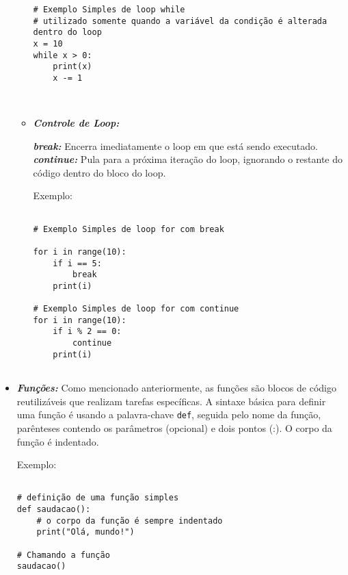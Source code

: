 \documentclass[a4paper, 12pt, onecolumn,singlespacing]{article}
\begin{document}
\begin{itemize}
\begin{itemize}
\begin{verbatim}
# Exemplo Simples de loop while
# utilizado somente quando a variável da condição é alterada dentro do loop
x = 10
while x > 0:
	print(x)
	x -= 1

	
\end{verbatim}
\label{exemplo_estruturas_de_repeticao}

	\item \textbf{\textit{Controle de Loop:}}
	
	\subitem \textbf{\textit{break:}} Encerra imediatamente o loop em que está sendo executado.
	\subitem \textbf{\textit{continue:}} Pula para a próxima iteração do loop, ignorando o restante do código dentro do bloco do loop.

	Exemplo:

	\begin{verbatim}

# Exemplo Simples de loop for com break

for i in range(10):
	if i == 5:
		break
	print(i)

# Exemplo Simples de loop for com continue
for i in range(10):
	if i % 2 == 0:
		continue
	print(i)
		
	\end{verbatim}
	\label{exemplo_estruturas_de_controle_de_loop}
	
	\end{itemize}
	\item \textbf{\textit{Funções:}} Como mencionado anteriormente, as funções são blocos de código reutilizáveis que realizam tarefas específicas. A sintaxe básica para definir uma função é usando a palavra-chave \texttt{def}, seguida pelo nome da função, parênteses contendo os parâmetros (opcional) e dois pontos (:). O corpo da função é indentado.
	
	Exemplo:
	
		\begin{verbatim}
			
# definição de uma função simples		
def saudacao():
	# o corpo da função é sempre indentado
	print("Olá, mundo!")

# Chamando a função
saudacao()

		\end{verbatim}
		\label{exemplo_funcoes}
	
	\end{itemize}
\end{document}
